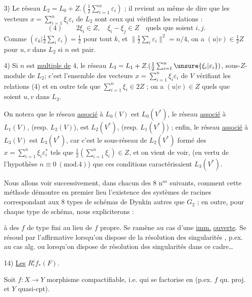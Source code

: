 3) Le réseau $L_2=L_0+Z.(\frac12\sum_{i=1}^n\varepsilon_i)$ ; il revient au même de dire que les vecteurs
$x=\sum_{i=1}^n\xi_i\varepsilon_i$ de $L_2$ sont ceux qui vérifient les relations :
\[
(4)\qquad 2\xi_i\in Z,\quad \xi_i-\xi_j\in Z\quad\text{quels que soient }i,j.
\]
Comme $(\varepsilon_k|\frac12\sum_i\varepsilon_i)=\frac12$ pour tout $k$, et
$\|\frac12\sum_i\varepsilon_i\|^2=n/4$, on a $(u|v)\in\frac12 Z$
pour $u,v$ dans $L_2$ si $n$ est pair.

4) Si $n$ est \uline{multiple de} 4, le réseau $L_3=L_1+Z.(\frac12\sum_{i=1}^n\unsure{\xi_i|\varepsilon_i})$, sous-$Z$-module de $L_2$;
c'est l'ensemble des vecteurs $x=\sum_{i=1}^n\xi_i\varepsilon_i$ de $V$ vérifiant les relations (4) et
en outre tels que $\sum_{i=1}^n\xi_i\in 2Z$ ; on a $(u|v)\in Z$ quels que soient $u,v$ dans $L_3$.

On notera que le réseau \uline{associé} à $L_0(V)$ est $L_0(V^*)$, le réseau \uline{associé}
à $L_1(V)$, (resp. $L_2(V)$), est $L_2(V^*)$, (resp. $L_1(V^*)$) ; enfin, le réseau \uline{associé}
à $L_3(V)$ est $L_3(V^*)$, car c'est le sous-réseau de $L_2(V^*)$ formé des $x=\sum_{i=1}^n\xi_i\varepsilon_i^*$
tels que $\frac12(\sum_{i=1}^n\xi_i)\in Z$, et on vient de voir, (en vertu de l'hypothèse $n\equiv0\ (\mathrm{mod}.4)$)
que ces conditions caractérisaient $L_3(V^*)$.

Nous allons voir successivement, dans chacun des 8 n$^{os}$ suivants, comment
cette méthode démontre en premier lieu l'existence des systèmes de racines
correspondant aux 8 types de schémas de Dynkin autres que $G_2$ ; en outre, pour
chaque type de schéma, nous expliciterons :



à des $f$ de type fini au lieu de $f$
propre. Se ramène au cas d'une \uline{imm.}
\uline{ouverte}. Se résoud par l'affirmative
lorsqu'on dispose de la résolution des
singularités , p.ex. au cas 
 
alg. ou lorsqu'on dispose de résolution
des singularités  dans ce cadre\ldots

14) \uline{Les} $R^i_!f_*(F)$.

Soit $f:X\longrightarrow Y$ morphisme compactifiable,
i.e. qui se factorise en
(p.ex. $f$ qu. proj. et $Y$ quasi-cpt).

